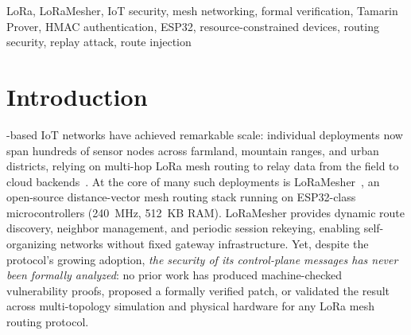 \documentclass[10pt,journal,compsoc]{IEEEtran}
\begin{document}
{\begin{abstract}
We validate the patched protocol across 225~ns-3 simulation runs
(135 core + 90 scale-validation runs up to 49~nodes),
confirming 0\% residual PDR degradation across all topologies,
and reproduce the attack and patch on six physical ESP32-S3 boards
across three experiments: a three-node injection demo
(baseline PDR~=~0\%; patched PDR~=~87\%), a six-node multi-hop
relay chain (3/4 relay nodes route-poisoned in baseline; 0/4
in patched, Node~A PDR~=~85\%), and a reboot-replay validation
confirming that NVS-persisted MetricVersion counters fully close
the post-reboot window.
All artifacts—Tamarin models, ns-3 code, patched firmware, and
hardware experiment logs—are released under MIT license.
\end{abstract}

\begin{IEEEkeywords}
LoRa, LoRaMesher, IoT security, mesh networking, formal verification,
Tamarin Prover, HMAC authentication, ESP32, resource-constrained devices,
routing security, replay attack, route injection
\end{IEEEkeywords}

}%

\maketitle
\IEEEdisplaynontitleabstractindextext
\IEEEpeerreviewmaketitle

\section{Introduction}
\label{sec:intro}

-based IoT networks have achieved remarkable
scale: individual deployments now span hundreds of sensor nodes
across farmland, mountain ranges, and urban districts, relying on
multi-hop LoRa mesh routing to relay data from the field to cloud
backends~\cite{repetto2025-lorawan-drone-attack,yang2021-lorawan-systematic,ieee2025-lora-hierarchy-routing}. At the core of
many such deployments is LoRaMesher~\cite{sole2022-loramesher,sole2024-loramesher-dv,sole2026-loramesher-swx,repetto2022-lorawan-demo},
an open-source distance-vector mesh routing stack running on
ESP32-class microcontrollers (240~MHz, 512~KB RAM).
LoRaMesher provides dynamic route discovery, neighbor management,
and periodic session rekeying, enabling self-organizing networks
without fixed gateway infrastructure.
Yet, despite the protocol's growing adoption, \emph{the security
of its control-plane messages has never been formally analyzed}:
no prior work has produced machine-checked vulnerability proofs,
proposed a formally verified patch, or validated the result across
multi-topology simulation and physical hardware for any LoRa mesh
routing protocol.
\end{document}
